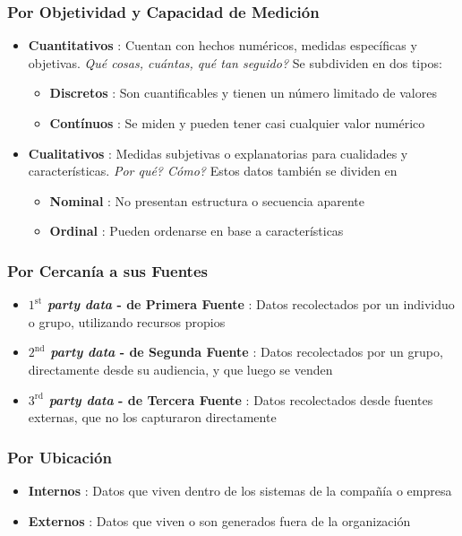 \subsubsection{Por Objetividad y Capacidad de Medición}
\begin{itemize}
    \item{\textbf{Cuantitativos} : Cuentan con hechos numéricos, medidas específicas y objetivas. \textit{Qué cosas, cuántas, qué tan seguido?} Se subdividen en dos tipos:
    \begin{itemize}
        \item{\textbf{Discretos} : Son cuantificables y tienen un número limitado de valores}
        \item{\textbf{Contínuos} : Se miden y pueden tener casi cualquier valor numérico}
    \end{itemize}}
    \item{\textbf{Cualitativos} : Medidas subjetivas o explanatorias para cualidades y características. \textit{Por qué? Cómo?} Estos datos también se dividen en
    \begin{itemize}
        \item{\textbf{Nominal} : No presentan estructura o secuencia aparente}
        \item{\textbf{Ordinal} : Pueden ordenarse en base a características}
    \end{itemize}}
\end{itemize}

\subsubsection{Por Cercanía a sus Fuentes}
\begin{itemize}
    \item {\textbf{\textit{$1^{\text{st}}$ party data} - de Primera Fuente} : Datos recolectados por un individuo o grupo, utilizando recursos propios}
    \item {\textbf{\textit{$2^{\text{nd}}$ party data} - de Segunda Fuente} : Datos recolectados por un grupo, directamente desde su audiencia, y que luego se venden}
    \item {\textbf{\textit{$3^{\text{rd}}$ party data} - de Tercera Fuente} : Datos recolectados desde fuentes externas, que no los capturaron directamente}
\end{itemize}

\subsubsection{Por Ubicación}
\begin{itemize}
    \item {\textbf{Internos} : Datos que viven dentro de los sistemas de la compañía o empresa}
    \item {\textbf{Externos} : Datos que viven o son generados fuera de la organización}
\end{itemize}

